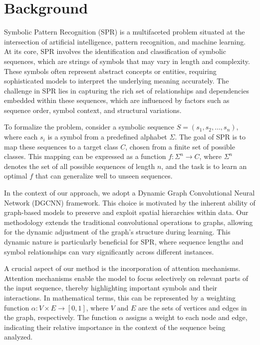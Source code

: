 \documentclass{article}
\begin{document}
\section{Background}
Symbolic Pattern Recognition (SPR) is a multifaceted problem situated at the intersection of artificial intelligence, pattern recognition, and machine learning. At its core, SPR involves the identification and classification of symbolic sequences, which are strings of symbols that may vary in length and complexity. These symbols often represent abstract concepts or entities, requiring sophisticated models to interpret the underlying meaning accurately. The challenge in SPR lies in capturing the rich set of relationships and dependencies embedded within these sequences, which are influenced by factors such as sequence order, symbol context, and structural variations.

To formalize the problem, consider a symbolic sequence \( S = (s_1, s_2, \ldots, s_n) \), where each \( s_i \) is a symbol from a predefined alphabet \(\Sigma\). The goal of SPR is to map these sequences to a target class \( C \), chosen from a finite set of possible classes. This mapping can be expressed as a function \( f: \Sigma^n \rightarrow C \), where \( \Sigma^n \) denotes the set of all possible sequences of length \( n \), and the task is to learn an optimal \( f \) that can generalize well to unseen sequences.

In the context of our approach, we adopt a Dynamic Graph Convolutional Neural Network (DGCNN) framework. This choice is motivated by the inherent ability of graph-based models to preserve and exploit spatial hierarchies within data. Our methodology extends the traditional convolutional operations to graphs, allowing for the dynamic adjustment of the graph's structure during learning. This dynamic nature is particularly beneficial for SPR, where sequence lengths and symbol relationships can vary significantly across different instances.

A crucial aspect of our method is the incorporation of attention mechanisms. Attention mechanisms enable the model to focus selectively on relevant parts of the input sequence, thereby highlighting important symbols and their interactions. In mathematical terms, this can be represented by a weighting function \( \alpha: V \times E \rightarrow [0, 1] \), where \( V \) and \( E \) are the sets of vertices and edges in the graph, respectively. The function \( \alpha \) assigns a weight to each node and edge, indicating their relative importance in the context of the sequence being analyzed.
\end{document}
